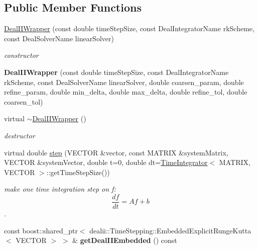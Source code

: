 \subsection*{Public Member Functions}
\begin{DoxyCompactItemize}
\item 
\hypertarget{classnatrium_1_1DealIIWrapper_a19bdd1ce28caf67d223d809d28359a02}{
\hyperlink{classnatrium_1_1DealIIWrapper_a19bdd1ce28caf67d223d809d28359a02}{DealIIWrapper} (const double timeStepSize, const DealIntegratorName rkScheme, const DealSolverName linearSolver)}
\label{classnatrium_1_1DealIIWrapper_a19bdd1ce28caf67d223d809d28359a02}

\begin{DoxyCompactList}\small\item\em constructor \item\end{DoxyCompactList}\item 
\hypertarget{classnatrium_1_1DealIIWrapper_a8f960bc0009457b1861f22273f331a01}{
{\bfseries DealIIWrapper} (const double timeStepSize, const DealIntegratorName rkScheme, const DealSolverName linearSolver, double coarsen\_\-param, double refine\_\-param, double min\_\-delta, double max\_\-delta, double refine\_\-tol, double coarsen\_\-tol)}
\label{classnatrium_1_1DealIIWrapper_a8f960bc0009457b1861f22273f331a01}

\item 
\hypertarget{classnatrium_1_1DealIIWrapper_a193b75fd9e4734d14988927c21312c8a}{
virtual \hyperlink{classnatrium_1_1DealIIWrapper_a193b75fd9e4734d14988927c21312c8a}{$\sim$DealIIWrapper} ()}
\label{classnatrium_1_1DealIIWrapper_a193b75fd9e4734d14988927c21312c8a}

\begin{DoxyCompactList}\small\item\em destructor \item\end{DoxyCompactList}\item 
virtual double \hyperlink{classnatrium_1_1DealIIWrapper_a50227545e1fcff4c2d0f10a9c6eb3bca}{step} (VECTOR \&vector, const MATRIX \&systemMatrix, VECTOR \&systemVector, double t=0, double dt=\hyperlink{classnatrium_1_1TimeIntegrator}{TimeIntegrator}$<$ MATRIX, VECTOR $>$::getTimeStepSize())
\begin{DoxyCompactList}\small\item\em make one time integration step on f: \[ \frac{df}{dt} = Af+b \]. \item\end{DoxyCompactList}\item 
\hypertarget{classnatrium_1_1DealIIWrapper_aead07b81d0d8d218e8d4a435f1420b73}{
const boost::shared\_\-ptr$<$ dealii::TimeStepping::EmbeddedExplicitRungeKutta$<$ VECTOR $>$ $>$ \& {\bfseries getDealIIEmbedded} () const }
\label{classnatrium_1_1DealIIWrapper_aead07b81d0d8d218e8d4a435f1420b73}


\end{DoxyCompactItemize}
